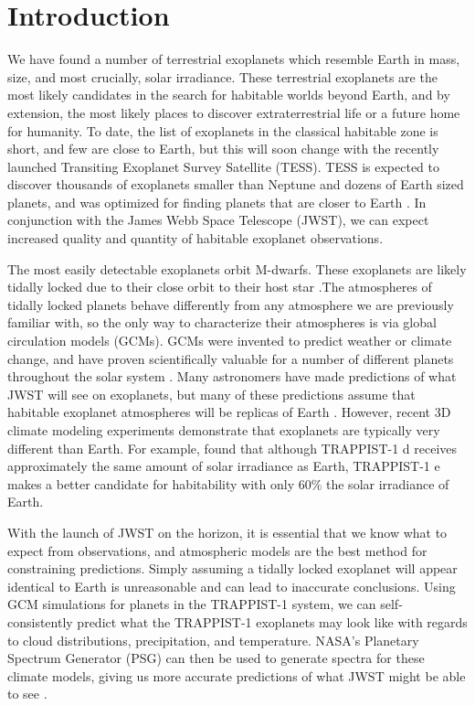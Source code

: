 \section{Introduction}
\label{sec:intro}
We have found a number of terrestrial
 exoplanets which resemble Earth in mass, size, and most crucially, solar
 irradiance. These terrestrial exoplanets are the most likely candidates in the
 search for habitable worlds beyond Earth, and by extension, the most likely
 places to discover extraterrestrial life or a future home for humanity. To
 date, the list of exoplanets in the classical habitable zone is short, and few
 are close to Earth, but this will soon change with the recently launched
 Transiting Exoplanet Survey Satellite (TESS). TESS is expected to discover
 thousands of exoplanets smaller than Neptune and dozens of Earth sized planets,
 and was optimized for finding planets that are closer to Earth
 \citep{tesspredict}. In conjunction with the James Webb Space Telescope (JWST),
 we can expect increased quality and quantity of habitable exoplanet
 observations.

The most easily detectable exoplanets orbit M-dwarfs. These exoplanets are
 likely tidally locked due to their close orbit
 to their host star \citep{dynamicsfate}.The
 atmospheres of tidally locked planets behave differently from any atmosphere
 we are previously
 familiar with, so the only way to characterize their atmospheres is via global
 circulation models (GCMs). GCMs were invented to predict
 weather or climate change, and have proven scientifically valuable for a number
 of different
 planets throughout the solar system \citep{venusgcm}. Many astronomers have
 made predictions of what JWST will see on exoplanets, but many of these
 predictions assume that habitable exoplanet atmospheres will be replicas of
 Earth \citep{ostproposal}. However, recent 3D climate modeling experiments
 demonstrate that exoplanets are typically very different than Earth. For
 example, \citet{wolf18} found that although TRAPPIST-1 d receives approximately
 the same amount of solar irradiance as Earth, TRAPPIST-1 e makes a better
 candidate for habitability with only 60\% the solar irradiance of Earth.

With the launch of JWST on the horizon, it is essential that we know what to
 expect from observations, and atmospheric models are the best method
 for constraining predictions. Simply assuming a tidally locked
 exoplanet will appear identical to Earth is unreasonable and can lead to
 inaccurate conclusions. Using GCM simulations for planets in the TRAPPIST-1
 system, we can self-consistently predict what the TRAPPIST-1 exoplanets may look
 like with regards to cloud distributions, precipitation, and temperature.
 NASA's Planetary Spectrum Generator (PSG) can then be used to generate spectra
 for these climate models, giving us more accurate predictions of what JWST
 might be able to see \citep{psgpaper}.

